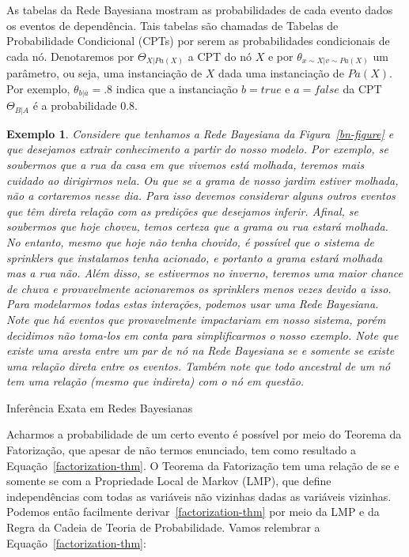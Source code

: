 \documentclass{amsart}
\makeatletter
\def\subsection{\@startsection{subsection}{3}%
  \z@{.5\linespacing\@plus.7\linespacing}{.1\linespacing}%
  {\normalfont\itshape}}
\theoremstyle{plain}
\newcounter{dummy-def}\numberwithin{dummy-def}{subsection}
\newcounter{dummy-thm}\numberwithin{dummy-thm}{subsection}
\newcounter{dummy-prop}\numberwithin{dummy-prop}{subsection}
\newcounter{dummy-ex}\numberwithin{dummy-ex}{subsection}
\newcounter{dummy-eg}\numberwithin{dummy-eg}{subsection}
\newtheorem{example}[dummy-eg]{Exemplo}
\numberwithin{equation}{subsection}
\makeatother
\begin{document}
As tabelas da Rede Bayesiana mostram as probabilidades de cada evento dados os eventos de
dependência. Tais tabelas são chamadas de Tabelas de Probabilidade Condicional (CPTs) por serem
as probabilidades condicionais de cada nó. Denotaremos por $\Theta_{X|Pa(X)}$ a CPT do nó $X$ e
por $\theta_{x\sim X|v\sim Pa(X)}$ um parâmetro, ou seja, uma instanciação de $X$ dada uma
instanciação de $Pa(X)$. Por exemplo, $\theta_{b|\overline{a}}=.8$ indica que a instanciação
$b=true$ e $a=false$ da CPT $\Theta_{B|A}$ é a probabilidade $0.8$.

\begin{example}\label{bn-example}
  Considere que tenhamos a Rede Bayesiana da Figura~\ref{bn-figure} e que desejamos extrair
  conhecimento a partir do nosso modelo. Por exemplo, se soubermos que a rua da casa em que vivemos
  está molhada, teremos mais cuidado ao dirigirmos nela. Ou que se a grama de nosso jardim estiver
  molhada, não a cortaremos nesse dia. Para isso devemos considerar alguns outros eventos que têm
  direta relação com as predições que desejamos inferir. Afinal, se soubermos que hoje choveu,
  temos certeza que a grama ou rua estará molhada. No entanto, mesmo que hoje não tenha chovido,
  é possível que o sistema de sprinklers que instalamos tenha acionado, e portanto a grama estará
  molhada mas a rua não. Além disso, se estivermos no inverno, teremos uma maior chance de chuva
  e provavelmente acionaremos os sprinklers menos vezes devido a isso. Para modelarmos todas estas
  interações, podemos usar uma Rede Bayesiana. Note que há eventos que provavelmente impactariam em
  nosso sistema, porém decidimos não toma-los em conta para simplificarmos o nosso exemplo. Note
  que existe uma aresta entre um par de nó na Rede Bayesiana se e somente se existe uma relação
  direta entre os eventos. Também note que todo ancestral de um nó tem uma relação (mesmo que
  indireta) com o nó em questão.
\end{example}

\subsection{Inferência Exata em Redes Bayesianas}

Acharmos a probabilidade de um certo evento é possível por meio do Teorema da Fatorização, que
apesar de não termos enunciado, tem como resultado a Equação~\ref{factorization-thm}. O Teorema
da Fatorização tem uma relação de se e somente se com a Propriedade Local de Markov (LMP), que
define independências com todas as variáveis não vizinhas dadas as variáveis vizinhas. Podemos
então facilmente derivar~\ref{factorization-thm} por meio da LMP e da Regra da Cadeia de Teoria de
Probabilidade. Vamos relembrar a Equação~\ref{factorization-thm}:
\end{document}
